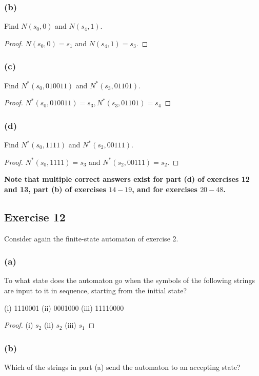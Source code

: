 \documentclass[14pt]{extarticle}
\newcommand{\cy}{\color{cyan}}
\begin{document}
\subsubsection{(b)}
Find \(N(s_0, 0)\) and \(N(s_4, 1)\).
\begin{proof}
    \(N(s_0, 0) = s_1\) and \(N(s_4, 1) = s_3\).
\end{proof}

\subsubsection{(c)}
Find \(N^*(s_0, 010011)\) and \(N^*(s_3, 01101)\).
\begin{proof}
    \(N^*(s_0, 010011) = s_3, N^*(s_3, 01101) = s_4\)
\end{proof}

\subsubsection{(d)}
Find \(N^*(s_0, 1111)\) and \(N^*(s_2, 00111)\).
\begin{proof}
    \(N^*(s_0, 1111) = s_3\) and \(N^*(s_2, 00111) = s_2\).
\end{proof}

{\bf \cy Note that multiple correct answers exist for part (d) of exercises 12 and 13, part (b) of exercises \(14-19\), and
for exercises \(20-48\).}

\subsection{Exercise 12}
Consider again the finite-state automaton of exercise 2.

\subsubsection{(a)}
To what state does the automaton go when the symbols of the following strings are input to it in sequence, starting from
the initial state?

(i) 1110001 (ii) 0001000 (iii) 11110000

\begin{proof}
    (i) \(s_2\) (ii) \(s_2\) (iii) \(s_1\)
\end{proof}

\subsubsection{(b)}
Which of the strings in part (a) send the automaton to an accepting state?
\end{document}
